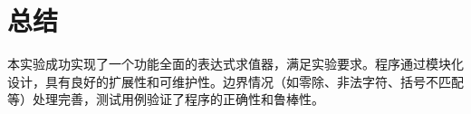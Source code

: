 \documentclass[UTF8]{ctexart}
\begin{document}
\section{总结}
本实验成功实现了一个功能全面的表达式求值器，满足实验要求。程序通过模块化设计，具有良好的扩展性和可维护性。边界情况（如零除、非法字符、括号不匹配等）处理完善，测试用例验证了程序的正确性和鲁棒性。
\end{document}
